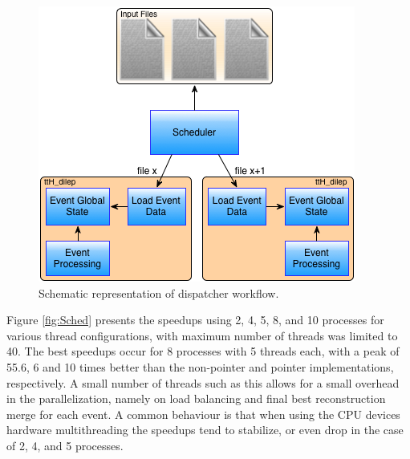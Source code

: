 \begin{figure}[!htp]
	\begin{center}
		\includegraphics[scale=0.4]{images/scheduler_workflow.png}
		\caption{Schematic representation of dispatcher workflow.}
		\label{fig:sched_flow}
	\end{center}
\end{figure}

Figure \ref{fig:Sched} presents the speedups using 2, 4, 5, 8, and 10 processes for various thread configurations, with maximum number of threads was limited to 40. The best speedups occur for 8 processes with 5 threads each, with a peak of 55.6, 6 and 10 times better than the non-pointer and pointer implementations, respectively. A small number of threads such as this allows for a small overhead in the \tth parallelization, namely on load balancing and final best reconstruction merge for each event. A common behaviour is that when using the CPU devices hardware multithreading the speedups tend to stabilize, or even drop in the case of 2, 4, and 5 processes.

